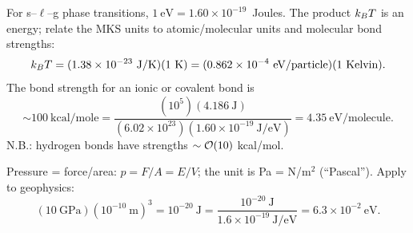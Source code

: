 For s--$\ell$--g phase transitions, $1\ \text{eV} = 1.60\times 10^{-19}$~Joules. The
product $k_{B} T$ is an energy; relate the MKS units to atomic/molecular units and
molecular bond strengths:
\begin{equation}
  \kB T = (1.38\times 10^{-23}\ \text{J/K})(1\ \text{K})
  = (0.862\times 10^{-4}\ \text{eV/particle})(1\ \text{Kelvin}).
\end{equation}
The bond strength for an ionic or covalent bond is
\begin{equation}
  \sim 100\ \text{kcal/mole} = \frac{(10^5)(4.186\ \text{J})}{(6.02\times 10^{23})(1.60\times 10^{-19}\ \text{J/eV})}
  = 4.35\ \text{eV/molecule}.
\end{equation}
N.B.: hydrogen bonds have strengths $\sim\mathcal{O}(10)$ kcal/mol.

Pressure = force/area: $p = F/A = E/V$; the unit is Pa = N/m$^2$ (``Pascal''). Apply to
geophysics:
\begin{equation}
  (10\ \text{GPa})(10^{-10}\ \text{m})^3 = 10^{-20}\ \text{J}
  = \frac{10^{-20}\ \text{J}}{1.6\times 10^{-19}\ \text{J/eV}} = 6.3\times 10^{-2}\ \text{eV}.
\end{equation}

\begin{diagram}
\end{diagram}

